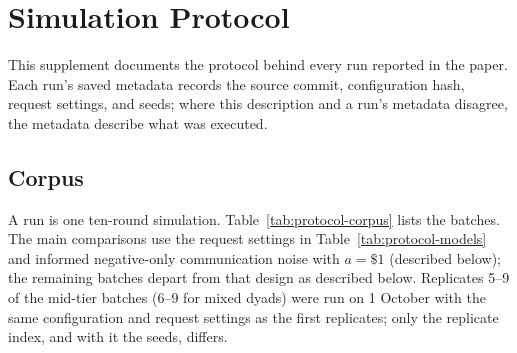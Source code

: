 
\section{Simulation Protocol}
\label{sec:canonical-simulation-protocol}

This supplement documents the protocol behind every run reported in the paper. Each run's saved metadata records the source commit, configuration hash, request settings, and seeds; where this description and a run's metadata disagree, the metadata describe what was executed.

\subsection{Corpus}
\label{sec:protocol-corpus}

A run is one ten-round simulation. Table~\ref{tab:protocol-corpus} lists the batches. The main comparisons use the request settings in Table~\ref{tab:protocol-models} and informed negative-only communication noise with $a=\$1$ (described below); the remaining batches depart from that design as described below. Replicates 5--9 of the mid-tier batches (6--9 for mixed dyads) were run on 1 October with the same configuration and request settings as the first replicates; only the replicate index, and with it the seeds, differs.

